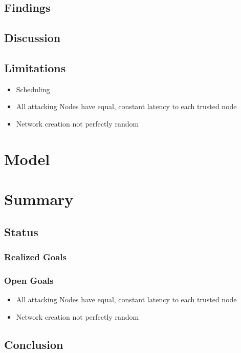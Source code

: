 \documentclass[a4paper,12pt,twoside]{report}
\begin{document}
\section{Findings}

\section{Discussion}

\section{Limitations}
\begin{itemize}
\item Scheduling
\item All attacking Nodes have equal, constant latency to each trusted node
\item Network creation not perfectly random

\end{itemize}


\chapter{Model}



\chapter{Summary}

\section{Status}

\subsection{Realized Goals}

\subsection{Open Goals}
\begin{itemize}
\item All attacking Nodes have equal, constant latency to each trusted node
\item Network creation not perfectly random
\end{itemize}
\section{Conclusion}
\end{document}
